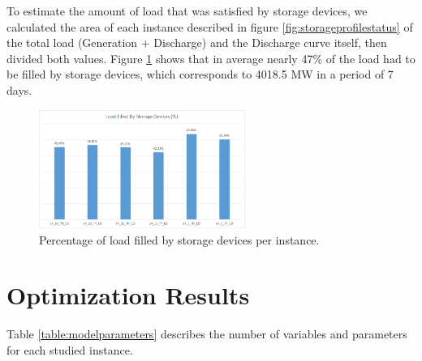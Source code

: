 \documentclass[12pt,LUDisStyle,twosided]{book}
\begin{document}
To estimate the amount of load that was satisfied by storage devices, we calculated the area of each instance described in figure \ref{fig:storageprofilestatus} of the total load (Generation + Discharge) and the Discharge curve itself, then divided both values. Figure \ref{fig:loadfilled} shows that in average nearly 47\% of the load had to be filled by storage devices, which corresponds to 4018.5 MW in a period of 7 days.

\begin{figure}[H] 
	\begin{center}
		\includegraphics[width=0.6\textwidth,keepaspectratio]{loadfilledstorage.png}
	  	\caption{Percentage of load filled by storage devices per instance.}
     	\label{fig:loadfilled}
	\end{center}
\end{figure}

\newpage
\section{Optimization Results} \label{section:optimizationresults}

Table \ref{table:modelparameters} describes the number of variables and parameters for each studied instance. 
\end{document}
